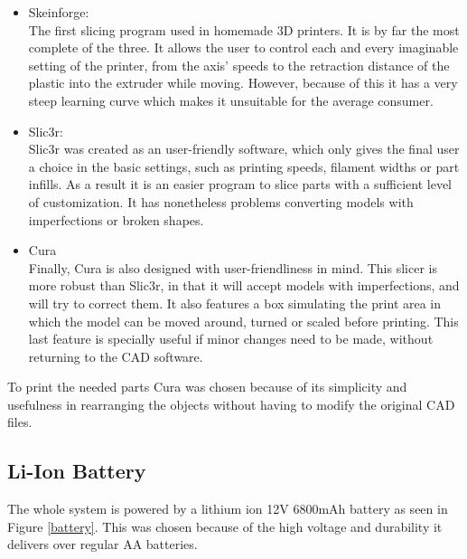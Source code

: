 			\begin{itemize}
			  
			  \item Skeinforge: \hfill \\
			  The first slicing program used in homemade 3D printers. It is by far the most complete of the three. It allows the user to control each and every imaginable setting of the printer, from the axis' speeds to the retraction distance of the plastic into the extruder while moving. However, because of this it has a very steep learning curve which makes it unsuitable for the average consumer.

			  \item Slic3r:  \hfill \\
			  Slic3r was created as an user-friendly software, which only gives the final user a choice in the basic settings, such as printing speeds, filament widths or part infills. As a result it is an easier program to slice parts with a sufficient level of customization. It has nonetheless problems converting models with imperfections or broken shapes.
			  
			  \item Cura \hfill \\
			  Finally, Cura is also designed with user-friendliness in mind. This slicer is more robust than Slic3r, in that it will accept models with imperfections, and will try to correct them. It also features a box simulating the print area in which the model can be moved around, turned or scaled before printing.
			  This last feature is specially useful if minor changes need to be made, without returning to the CAD software.
			
			\end{itemize}

		To print the needed parts Cura was chosen because of its simplicity and usefulness in rearranging the objects without having to modify the original CAD files.












\subsection{Li-Ion Battery}

	The whole system is powered by a lithium ion 12V 6800mAh battery as seen in Figure \ref{battery}. This was chosen because of the high voltage and durability it delivers over regular AA batteries.

